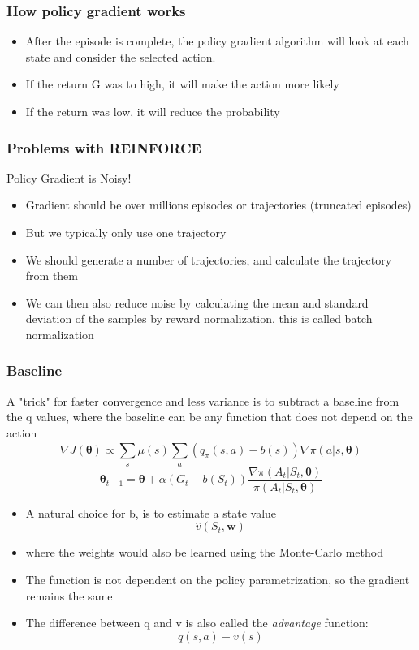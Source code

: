 \subsubsection*{How policy gradient works}
\begin{itemize}
    \item After the episode is complete, the policy gradient algorithm will look at each state and consider the selected action.
    \item If the return G was to high, it will make the action more likely
    \item If the return was low, it will reduce the probability
\end{itemize}

\subsubsection*{Problems with REINFORCE}
Policy Gradient is Noisy!
\begin{itemize}
    \item Gradient should be over millions episodes or trajectories (truncated episodes)
    \item But we typically only use one trajectory
    \item We should generate a number of trajectories, and calculate the trajectory from them 
    \item We can then also reduce noise by calculating the mean and standard deviation of the samples by reward normalization, this is called batch normalization
\end{itemize}

\subsubsection*{Baseline}
A "trick" for faster convergence and less variance is to subtract a baseline from the q values, where the baseline can be any function that does not depend on the action
\[
\nabla J({\boldsymbol{\theta}})\propto \sum_{s}^{}\mu(s)\sum_{a}^{}(q_\pi(s,a)-b(s))\nabla\pi(a|s,\boldsymbol{\theta})
\]
\[
    \boldsymbol{\theta}_{t+1} = \boldsymbol{\theta} + \alpha (G_t-b(S_t))\frac{\nabla\pi(A_t|S_t,\boldsymbol{\theta})}{\pi(A_t|S_t,\boldsymbol{\theta})}
\]
\begin{itemize}
    \item A natural choice for b, is to estimate a state value
    \[
    \hat{v}(S_t,\boldsymbol{w})
    \]
    \item where the weights would also be learned using the Monte-Carlo method
    \item The function is not dependent on the policy parametrization, so the gradient remains the same
    \item The difference between q and v is also called the \textit{advantage} function:
    \[
    q(s,a) - v(s)
    \]
\end{itemize}

